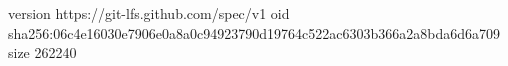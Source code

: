 version https://git-lfs.github.com/spec/v1
oid sha256:06c4e16030e7906e0a8a0c94923790d19764c522ac6303b366a2a8bda6d6a709
size 262240
